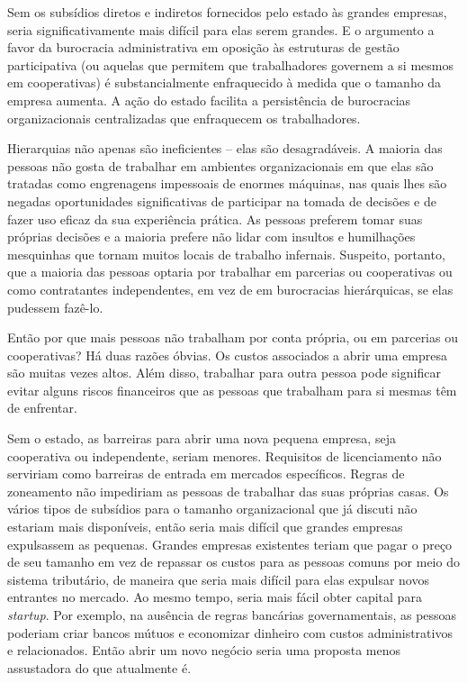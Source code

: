 Sem os subsídios diretos e indiretos fornecidos pelo estado às grandes empresas, seria significativamente mais difícil para elas serem grandes. E o argumento a favor da burocracia administrativa em oposição às estruturas de gestão participativa (ou aquelas que permitem que trabalhadores governem a si mesmos em cooperativas) é substancialmente enfraquecido à medida que o tamanho da empresa aumenta. A ação do estado facilita a persistência de burocracias organizacionais centralizadas que enfraquecem os trabalhadores.

Hierarquias não apenas são ineficientes -- elas são desagradáveis. A maioria das pessoas não gosta de trabalhar em ambientes organizacionais em que elas são tratadas como engrenagens impessoais de enormes máquinas, nas quais lhes são negadas oportunidades significativas de participar na tomada de decisões e de fazer uso eficaz da sua experiência prática. As pessoas preferem tomar suas próprias decisões e a maioria prefere não lidar com insultos e humilhações mesquinhas que tornam muitos locais de trabalho infernais. Suspeito, portanto, que a maioria das pessoas optaria por trabalhar em parcerias ou cooperativas ou como contratantes independentes, em vez de em burocracias hierárquicas, se elas pudessem fazê-lo.

Então por que mais pessoas não trabalham por conta própria, ou em parcerias ou cooperativas? Há duas razões óbvias. Os custos associados a abrir uma empresa são muitas vezes altos. Além disso, trabalhar para outra pessoa pode significar evitar alguns riscos financeiros que as pessoas que trabalham para si mesmas têm de enfrentar.

Sem o estado, as barreiras para abrir uma nova pequena empresa, seja cooperativa ou independente, seriam menores. Requisitos de licenciamento não serviriam como barreiras de entrada em mercados específicos. Regras de zoneamento não impediriam as pessoas de trabalhar das suas próprias casas. Os vários tipos de subsídios para o tamanho organizacional que já discuti não estariam mais disponíveis, então seria mais difícil que grandes empresas expulsassem as pequenas. Grandes empresas existentes teriam que pagar o preço de seu tamanho em vez de repassar os custos para as pessoas comuns por meio do sistema tributário, de maneira que seria mais difícil para elas expulsar novos entrantes no mercado. Ao mesmo tempo, seria mais fácil obter capital para \emph{startup}. Por exemplo, na ausência de regras bancárias governamentais, as pessoas poderiam criar bancos mútuos e economizar dinheiro com custos administrativos e relacionados. Então abrir um novo negócio seria uma proposta menos assustadora do que atualmente é.

